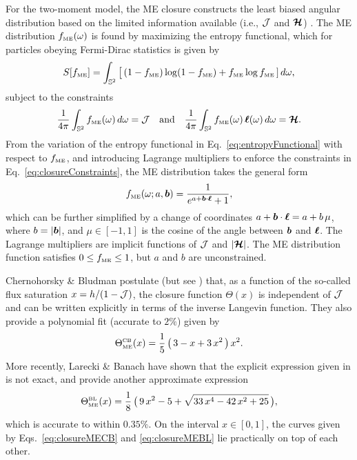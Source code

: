 For the two-moment model, the ME closure constructs the least biased angular distribution based on the limited information available (i.e., $\mathcal{J}$ and $\boldsymbol{\mathcal{H}}$) \cite{cernohorskyBludman_1994}.  
The ME distribution $f_{\mbox{\tiny ME}}(\omega)$ is found by maximizing the entropy functional, which for particles obeying Fermi-Dirac statistics is given by
\begin{equation}
  S[f_{\mbox{\tiny ME}}] 
  = \int_{\mathbb{S}^{2}}\big[\,(1-f_{\mbox{\tiny ME}})\log(1-f_{\mbox{\tiny ME}}) + f_{\mbox{\tiny ME}}\log f_{\mbox{\tiny ME}}\,]\,d\omega,
  \label{eq:entropyFunctional}
\end{equation} 
subject to the constraints
\begin{equation}
  \frac{1}{4\pi}\int_{\mathbb{S}^{2}}f_{\mbox{\tiny ME}}(\omega)\,d\omega=\mathcal{J}
  \quad\text{and}\quad
  \frac{1}{4\pi}\int_{\mathbb{S}^{2}}f_{\mbox{\tiny ME}}(\omega)\,\boldsymbol{\ell}(\omega)\,d\omega=\boldsymbol{\mathcal{H}}.  
  \label{eq:closureConstraints}
\end{equation}
From the variation of the entropy functional in Eq.~\eqref{eq:entropyFunctional} with respect to $f_{\mbox{\tiny ME}}$, and introducing Lagrange multipliers to enforce the constraints in Eq.~\eqref{eq:closureConstraints}, the ME distribution takes the general form
\begin{equation}
  f_{\mbox{\tiny ME}}(\omega;a,\boldsymbol{b})=\frac{1}{e^{a + \boldsymbol{b}\cdot\boldsymbol{\ell}}+1}, 
  \label{eq:fME}
\end{equation}
which can be further simplified by a change of coordinates $a + \boldsymbol{b}\cdot\boldsymbol{\ell}=a + b\,\mu$, where $b=|\boldsymbol{b}|$, and $\mu\in[-1,1]$ is the cosine of the angle between $\boldsymbol{b}$ and $\boldsymbol{\ell}$.  
The Lagrange multipliers are implicit functions of $\mathcal{J}$ and $|\boldsymbol{\mathcal{H}}|$.  
The ME distribution function satisfies $0 \le f_{\mbox{\tiny ME}} \le 1$, but $a$ and $b$ are unconstrained.  

Chernohorsky \& Bludman \cite{cernohorskyBludman_1994} postulate (but see \cite{lareckiBanach_2011}) that, as a function of the so-called flux saturation $x=h/(1-\mathcal{J})$, the closure function $\Theta(x)$ is independent of $\mathcal{J}$ and can be written explicitly in terms of the inverse Langevin function.  
They also provide a polynomial fit (accurate to $2\%$) given by
\begin{equation}
  \Theta_{\mbox{\tiny ME}}^{\mbox{\tiny CB}}(x)
  =\frac{1}{5}\,\big(\,3-x+3\,x^{2}\,\big)\,x^{2}.
  \label{eq:closureMECB}
\end{equation}
More recently, Larecki \& Banach \cite{lareckiBanach_2011} have shown that the explicit expression given in \cite{cernohorskyBludman_1994} is not exact, and provide another approximate expression
\begin{equation}
  \Theta_{\mbox{\tiny ME}}^{\mbox{\tiny BL}}(x)
  =\frac{1}{8}\,\big(\,9\,x^{2}-5+\sqrt{33\,x^{4}-42\,x^{2}+25}\,\big),
  \label{eq:closureMEBL}
\end{equation}
which is accurate to within $0.35\%$.  
On the interval $x\in[0,1]$, the curves given by Eqs.~\eqref{eq:closureMECB} and \eqref{eq:closureMEBL} lie practically on top of each other.  

